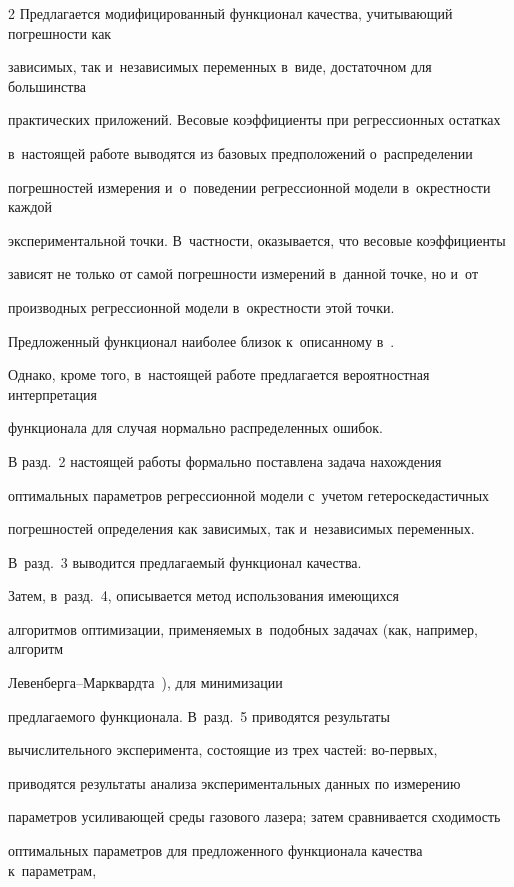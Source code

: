 \begin{multicols}{2}
Предлагается модифицированный функционал качества, учитывающий погрешности как

зависимых, так и~независимых переменных в~виде, достаточном для большинства

практических приложений. Весовые коэффициенты при регрессионных остатках

в~настоящей работе выводятся из базовых предположений о~рас\-пре\-де\-ле\-нии

погрешностей измерения и~о~поведении регрессионной модели в~окрест\-ности каж\-дой

экспериментальной точки. В~част\-ности, оказывается, что весовые коэффициенты

зависят не только от самой по\-греш\-ности измерений в~данной точке, но и~от

производных регрессионной модели в~окрестности этой точки.



Предложенный функционал наиболее близок к~описанному в~\cite{Boggs1987Stable}.

Однако, кроме того, в~настоящей работе предлагается вероятностная интерпретация

 функционала для случая нормально распределенных ошибок.



В разд.~2 настоящей работы формально по\-став\-ле\-на задача нахождения

оптимальных па\-ра\-мет\-ров регрессионной модели с~учетом гетероскедастичных

по\-греш\-но\-стей определения как зависимых, так и~независимых переменных.

В~разд.~3 выводится предлагаемый функционал качества.

Затем, в~разд.~4, описывается метод использования имеющихся

алгоритмов оптимизации, при\-ме\-ня\-емых в~подобных задачах (как, например, алгоритм

Ле\-вен\-бер\-га--Марк\-вард\-та~\cite{Marquardt1963Algorithm}), для минимизации

предлагаемого функционала. В~разд.~5 приводятся результаты

вычислительного эксперимента, со\-сто\-ящие из трех частей: во-пер\-вых,

приводятся результаты анализа экспериментальных данных по измерению

параметров усиливающей среды газового лазера; затем сравнивается сходимость

оптимальных параметров для предложенного функционала качества к~параметрам,


\end{multicols}
